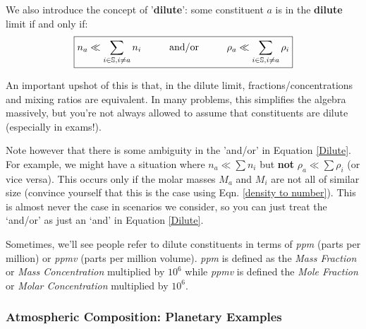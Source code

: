 We also introduce the concept of '\textbf{dilute}': some constituent $a$ is in the \textbf{dilute} limit if and only if:
\begin{align}\label{Dilute}
    \boxed{n_a\ll\sum\limits_{i\in\mathbb{S},i\neq a} n_i\hspace{10mm}\text{and/or}\hspace{10mm}
    \rho_a\ll\sum\limits_{i\in\mathbb{S},i\neq a} \rho_i}
\end{align}

An important upshot of this is that, in the dilute limit, fractions/concentrations and mixing ratios are equivalent. In many problems, this simplifies the algebra massively, but you're not always allowed to assume that constituents are dilute (especially in exams!).

Note however that there is some ambiguity in the 'and/or' in Equation \ref{Dilute}. For example, we might have a situation where $n_a\ll\sum n_i$ but \textbf{not} $\rho_a\ll\sum \rho_i$ (or vice versa). This occurs only if the molar masses $M_a$ and $M_i$ are not all of similar size (convince yourself that this is the case using Eqn. \ref{density to number}). This is almost never the case in scenarios we consider, so you can just treat the `and/or' as just an `and' in Equation \ref{Dilute}.

Sometimes, we'll see people refer to dilute constituents in terms of \textit{ppm} (parts per million) or \textit{ppmv} (parts per million volume). \textit{ppm} is defined as the \textit{Mass Fraction} or \textit{Mass Concentration} multiplied by $10^{6}$ while \textit{ppmv} is defined the \textit{Mole Fraction} or \textit{Molar Concentration} multiplied by $10^{6}$. 

\subsubsection{Atmospheric Composition: Planetary Examples}

